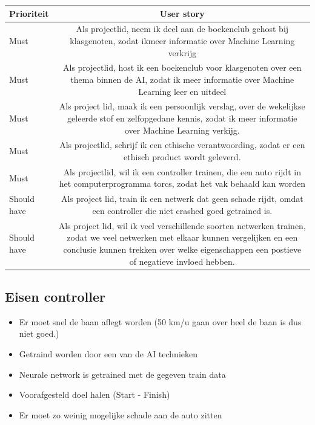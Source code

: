 \documentclass{article}
\begin{document}
\begin{table}[h]
\begin{tabularx}{\textwidth}{l C}
 \textbf{Prioriteit} & \textbf{User story}\\ \hline
 Must & Als projectlid, neem ik deel aan de boekenclub gehost bij klasgenoten, 
zodat ikmeer informatie over Machine Learning verkrijg\\ \hline
 Must & Als projectlid, host ik een boekenclub voor klasgenoten over een thema binnen de AI, zodat ik meer informatie over Machine Learning leer en uitdeel\\\hline
Must & Als project lid, maak ik een persoonlijk verslag, over de wekelijkse geleerde stof en zelfopgedane kennis, zodat ik meer informatie over Machine Learning verkijg.   \\\hline
 Must & Als projectlid, schrijf ik een ethische verantwoording, zodat er een ethisch product wordt geleverd.   \\\hline
 Must & Als projectlid, wil ik een controller trainen, die een auto rijdt in het computerprogramma torcs, zodat het vak behaald kan worden \\\hline
Should have & Als project lid, train ik een netwerk dat geen schade rijdt, omdat een controller die niet crashed goed getrained is. \\\hline
Should have & Als project lid, wil ik veel verschillende soorten netwerken trainen, zodat we veel netwerken met elkaar kunnen vergelijken en een conclusie kunnen trekken over welke eigenschappen een postieve of negatieve invloed hebben. \\
\end{tabularx}
\end{table} 
 
\subsection*{Eisen controller}
\begin{itemize}
\item Er moet snel de baan aflegt worden (50 km/u gaan over heel de baan is dus niet goed.)
\item Getraind worden door een van de AI technieken
\item Neurale network is getrained met de gegeven train data
\item Voorafgesteld doel halen (Start - Finish)
\item Er moet zo weinig mogelijke schade aan de auto zitten
\end{itemize}
\end{document}
